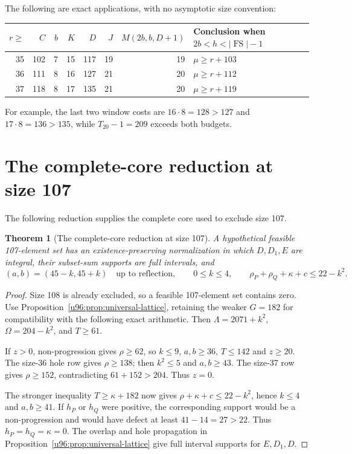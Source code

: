 \documentclass[11pt,a4paper]{article}
\newtheorem{theorem}{Theorem}[section]
\theoremstyle{remark}
\newcommand{\FS}{\operatorname{FS}}
\begin{document}
The following are exact applications, with no asymptotic size convention:
\begin{center}
\begin{tabular}{rrrrrrrl}
\toprule
$r\geq$&$C$&$b$&$K$&$D$&$J$&$M(2b,b,D+1)$&Conclusion when $2b<h<|\FS|-1$\\
\midrule
35&102&7&15&117&19&19&$\mu\geq r+103$\\
36&111&8&16&127&21&20&$\mu\geq r+112$\\
37&118&8&17&135&21&20&$\mu\geq r+119$\\
\bottomrule
\end{tabular}
\end{center}
For example, the last two window costs are $16\cdot8=128>127$ and
$17\cdot8=136>135$, while $T_{20}-1=209$ exceeds both budgets.

\section{The complete-core reduction at size 107}
\label{u96:sec:107-structure}
The following reduction supplies the complete core used to exclude size 107.
\begin{theorem}[The complete-core reduction at size 107]\label{u96:thm:107-core}
A hypothetical feasible 107-element set has an existence-preserving
normalization in which $D,D_1,E$ are integral, their subset-sum supports
are full intervals, and
\[
 (a,b)=(45-k,45+k)\quad\text{up to reflection},\qquad
 0\leq k\leq4,\qquad \rho_P+\rho_Q+\kappa+c\leq22-k^2.
\]
\end{theorem}
\begin{proof}
Size 108 is already excluded, so a feasible 107-element set contains zero.
Use Proposition~\ref{u96:prop:universal-lattice}, retaining the weaker
$G=182$ for compatibility with the following exact arithmetic. Then
$\Lambda=2071+k^2$, $\Omega=204-k^2$, and $T\geq61$.

If $z>0$, non-progression gives $\rho\geq62$, so $k\leq9$,
$a,b\geq36$, $T\leq142$ and $z\geq20$.
The size-36 hole row gives $\rho\geq138$; then $k^2\leq5$ and
$a,b\geq43$. The size-37 row gives $\rho\geq152$, contradicting
$61+152>204$. Thus $z=0$.

The stronger inequality $T\geq\kappa+182$ now gives
$\rho+\kappa+c\leq22-k^2$, hence $k\leq4$ and $a,b\geq41$.
If $h_P$ or $h_Q$ were positive, the corresponding support would be a
non-progression and would have defect at least $41-14=27>22$.
Thus $h_P=h_Q=\kappa=0$. The overlap and hole propagation in
Proposition~\ref{u96:prop:universal-lattice} give full interval supports
for $E,D_1,D$.
\end{proof}
\end{document}
